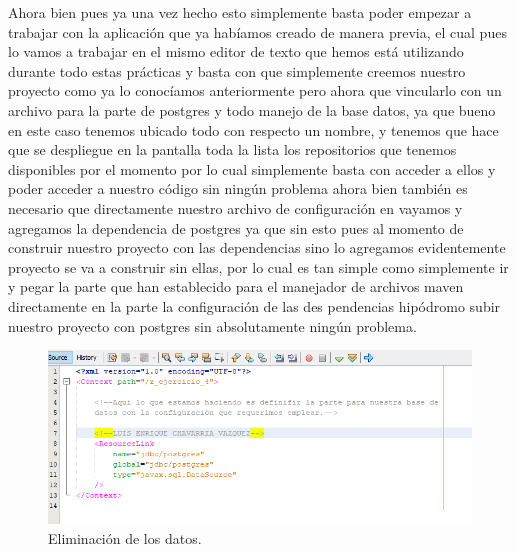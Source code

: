 \documentclass[10pt,a4paper]{article}
\begin{document}
Ahora bien pues ya una vez hecho esto simplemente basta poder empezar a trabajar con la aplicación que ya habíamos creado de manera previa, el cual pues lo vamos a trabajar en el mismo editor de texto que hemos está utilizando durante todo estas prácticas y basta con que simplemente creemos nuestro proyecto como ya lo conocíamos anteriormente pero ahora que vincularlo con un archivo para la parte de postgres y todo manejo de la base datos, ya que bueno en este caso tenemos ubicado todo con respecto un nombre, y tenemos que hace que se despliegue en la pantalla toda la lista los repositorios que tenemos disponibles por el momento por lo cual simplemente basta con acceder a ellos y poder acceder a nuestro código sin ningún problema ahora bien también es necesario que directamente nuestro archivo de configuración en vayamos y agregamos la dependencia de postgres ya que sin esto pues al momento de construir nuestro proyecto con las dependencias sino lo agregamos evidentemente proyecto se va a construir sin ellas, por lo cual es tan simple como simplemente ir y pegar la parte que han establecido para el manejador de archivos maven directamente en la parte la configuración de las des pendencias hipódromo subir nuestro proyecto con postgres sin absolutamente ningún problema.
\begin{figure}[h]
\centering
\includegraphics[width=13cm]{3XX}
\caption{Eliminación de los datos.}
\label{fig:re1}
\end{figure}
\end{document}

